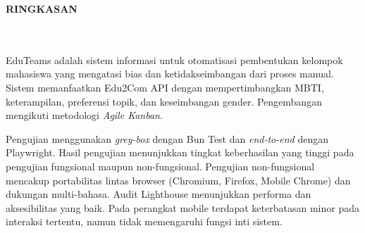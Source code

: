\clearpage
{}%
\thispagestyle{fancy}

\begin{center}
	\large \bfseries \MakeUppercase{Ringkasan}\\
	\normalsize \normalfont {\thetitle}\\
	\normalsize \normalfont {\theauthor}\\
	\bigskip
	
	\normalsize \normalfont \justifying
	EduTeams adalah sistem informasi untuk otomatisasi pembentukan kelompok mahasiswa yang mengatasi bias dan ketidakseimbangan dari proses manual. Sistem memanfaatkan Edu2Com API dengan mempertimbangkan MBTI, keterampilan, preferensi topik, dan keseimbangan gender. Pengembangan mengikuti metodologi \textit{Agile Kanban}.\par

	Pengujian menggunakan \textit{grey-box} dengan Bun Test dan \textit{end-to-end} dengan Playwright. Hasil pengujian menunjukkan tingkat keberhasilan yang tinggi pada pengujian fungsional maupun non-fungsional. Pengujian non-fungsional mencakup portabilitas lintas browser (Chromium, Firefox, Mobile Chrome) dan dukungan multi-bahasa. Audit Lighthouse menunjukkan performa dan aksesibilitas yang baik. Pada perangkat mobile terdapat keterbatasan minor pada interaksi tertentu, namun tidak memengaruhi fungsi inti sistem.\par



	\vfill
	
\end{center}
\clearpage